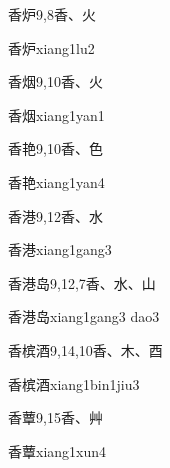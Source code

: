 \begin{Entry}{香炉}{9,8}{⾹、⽕}
  \begin{Phonetics}{香炉}{xiang1lu2}
  \end{Phonetics}
\end{Entry}

\begin{Entry}{香烟}{9,10}{⾹、⽕}
  \begin{Phonetics}{香烟}{xiang1yan1}
  \end{Phonetics}
\end{Entry}

\begin{Entry}{香艳}{9,10}{⾹、⾊}
  \begin{Phonetics}{香艳}{xiang1yan4}
  \end{Phonetics}
\end{Entry}

\begin{Entry}{香港}{9,12}{⾹、⽔}
  \begin{Phonetics}{香港}{xiang1gang3}
  \end{Phonetics}
\end{Entry}

\begin{Entry}{香港岛}{9,12,7}{⾹、⽔、⼭}
  \begin{Phonetics}{香港岛}{xiang1gang3 dao3}
  \end{Phonetics}
\end{Entry}

\begin{Entry}{香槟酒}{9,14,10}{⾹、⽊、⾣}
  \begin{Phonetics}{香槟酒}{xiang1bin1jiu3}
  \end{Phonetics}
\end{Entry}

\begin{Entry}{香蕈}{9,15}{⾹、⾋}
  \begin{Phonetics}{香蕈}{xiang1xun4}
  \end{Phonetics}
\end{Entry}

